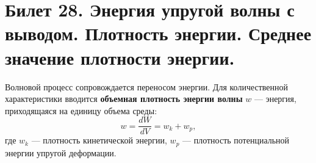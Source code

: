 \section{Билет 28. Энергия упругой волны с выводом. Плотность энергии. Среднее значение плотности энергии.}

\begin{definition}
Волновой процесс сопровождается переносом энергии. Для количественной характеристики вводится \textbf{объемная плотность энергии волны} $w$ --- энергия, приходящаяся на единицу объема среды:
\begin{equation}
    w = \frac{dW}{dV} = w_k + w_p,
\end{equation}
где $w_k$ --- плотность кинетической энергии, $w_p$ --- плотность потенциальной энергии упругой деформации.
\end{definition}

